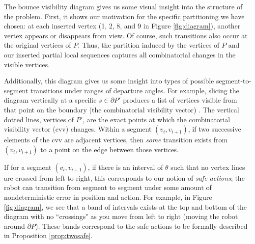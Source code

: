 \documentclass[]{styles/svproc}  %
\begin{document}
The bounce visibility diagram gives us some visual insight into the structure of
the problem. First, it shows our motivation for the specific partitioning we
have chosen: at each inserted vertex (1, 2, 8, and 9 in Figure
\ref{fig:diagram}), another vertex appears or disappears from view. Of course, such
transitions also occur at the original vertices of $P$. Thus, the partition induced by the
vertices of $P$ and our inserted partial local sequences captures all
combinatorial changes in the visible vertices.

Additionally, this diagram gives us some insight into types of possible
segment-to-segment transitions under ranges of departure angles. 
For example, slicing the diagram vertically at a specific $s \in \partial P'$
produces a list of vertices visible from that point on the boundary (the
combinatorial visibility vector) \cite{suri2008simple}. The vertical dotted
lines, vertices of $P'$, are the exact points at which the combinatorial visibility
vector (cvv) changes. Within a segment $(v_i, v_{i+1})$, if two successive elements of the cvv are 
adjacent vertices, then \emph{some} transition exists from
$(v_i, v_{i+1})$ to a point on the edge between those vertices.

If for a segment $(v_i, v_{i+1})$, if there is an interval of $\theta$ such that
no vertex lines are crossed from left to right, this corresponds to our notion
of \emph{safe actions}; the robot can transition from segment to segment under
some amount of nondeterministic error in position and action.
For example, in
Figure \ref{fig:diagram}, we see that a band of intervals exists at the top and
bottom of the diagram with no ``crossings" as you move from left to right
(moving the robot around $\partial P$). These bands correspond to the safe
actions to be formally described in Proposition \ref{prop:twosafe}.

%
\end{document}
